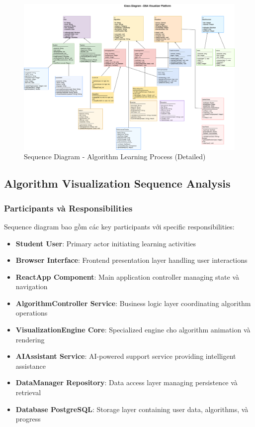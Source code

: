 \begin{figure}[H]
\centering
\includegraphics[width=1.0\textwidth]{enhanced-diagrams/class-diagram-clean.png}
\caption{Sequence Diagram - Algorithm Learning Process (Detailed)}
\label{fig:sequence-detailed}
\end{figure}

\subsection{Algorithm Visualization Sequence Analysis}
\label{subsec:visualization-sequence}

\subsubsection{Participants và Responsibilities}

Sequence diagram bao gồm các key participants với specific responsibilities:

\begin{itemize}
    \item \textbf{Student User}: Primary actor initiating learning activities
    \item \textbf{Browser Interface}: Frontend presentation layer handling user interactions
    \item \textbf{ReactApp Component}: Main application controller managing state và navigation
    \item \textbf{AlgorithmController Service}: Business logic layer coordinating algorithm operations
    \item \textbf{VisualizationEngine Core}: Specialized engine cho algorithm animation và rendering
    \item \textbf{AIAssistant Service}: AI-powered support service providing intelligent assistance
    \item \textbf{DataManager Repository}: Data access layer managing persistence và retrieval
    \item \textbf{Database PostgreSQL}: Storage layer containing user data, algorithms, và progress
\end{itemize}

